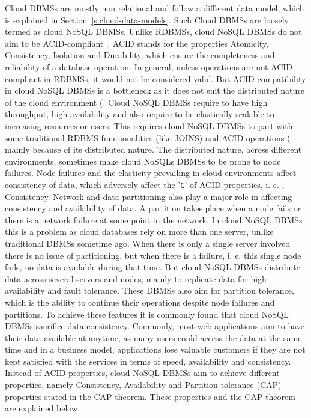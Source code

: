 Cloud \acp{DBMS} are mostly non relational and follow a different data model,
which is explained in Section~\ref{s:cloud-data-models}.  Such Cloud \acp{DBMS}
are loosely termed as cloud \ac{NoSQL} \acp{DBMS}.  Unlike \acp{RDBMS},   cloud
\ac{NoSQL} \acp{DBMS} do not aim to be
ACID-compliant~\citep{Stonebraker,Florescu}.
ACID stands for the properties Atomicity,   Consistency,   Isolation and
Durability, which ensure the completeness and reliability of a database
operation.  In general,   unless operations are not ACID compliant in
\acp{RDBMS},   it would not be considered valid.
But ACID compatibility in cloud \ac{NoSQL} \acp{DBMS} is a bottleneck as it does
not suit the distributed nature of the cloud environment (.
Cloud \ac{NoSQL} \acp{DBMS} require to have high throughput,   high availability
and also require to be elastically scalable to increasing resources or users.
This requires cloud \ac{NoSQL} \acp{DBMS} to part with some traditional
\ac{RDBMS} functionalities (like JOINS) and ACID operations ( mainly because of its distributed nature.  The distributed nature, across
different environments,   sometimes make cloud \acp{NoSQL} \acp{DBMS} to be
prone to node failures.  Node failures and the elasticity prevailing in cloud
environments affect consistency of data,   which adversely affect the
'\texttt{C}' of ACID properties,   i. e. ,   Consistency.  Network and data
partitioning also play a major role in affecting consistency and availability of
data.   A partition takes place when a node fails or there is a network failure
at some point in the network.  In cloud \ac{NoSQL} \acp{DBMS} this is a problem
as cloud databases rely on more than one server,   unlike traditional \acp{DBMS}
sometime ago.  When there is only a single server involved there is no issue of
partitioning,   but when there is a failure,   i. e.  this single node fails, no
data is available during that time.  But cloud \ac{NoSQL} \acp{DBMS} distribute
data across several servers and nodes,   mainly to replicate data for high
availability and fault tolerance.
These \acp{DBMS} also aim for partition tolerance,   which is the ability to
continue their operations despite node failures and partitions.  To achieve
these features it is commonly found that cloud \ac{NoSQL} \acp{DBMS} sacrifice
data consistency.  Commonly,   most web applications aim to have their data
available at anytime,   as many users could access the data at the same time and
in a business model,   applications lose valuable customers if they are not kept
satisfied with the services in terms of speed,   availability and consistency.
Instead of ACID properties,   cloud \ac{NoSQL} \acp{DBMS} aim to achieve
different properties,   namely Consistency,   Availability and
Partition-tolerance (CAP) properties stated in the CAP theorem.
These properties and the CAP theorem are explained below.

